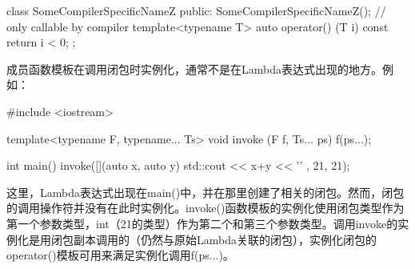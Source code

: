\begin{cpp}
class SomeCompilerSpecificNameZ
{
	public:
	SomeCompilerSpecificNameZ(); // only callable by compiler
	template<typename T>
	auto operator() (T i) const
	{
		return i < 0;
	}
};
\end{cpp}

成员函数模板在调用闭包时实例化，通常不是在Lambda表达式出现的地方。例如：

\begin{cpp}
#include <iostream>

template<typename F, typename... Ts> void invoke (F f, Ts... ps)
{
	f(ps...);
}

int main()
{
	invoke([](auto x, auto y) {
		std::cout << x+y << '\n'
	},
	21, 21);
}
\end{cpp}

这里，Lambda表达式出现在main()中，并在那里创建了相关的闭包。然而，闭包的调用操作符并没有在此时实例化。invoke()函数模板的实例化使用闭包类型作为第一个参数类型，int（21的类型）作为第二个和第三个参数类型。调用invoke的实例化是用闭包副本调用的（仍然与原始Lambda关联的闭包），实例化闭包的operator()模板可用来满足实例化调用f(ps...)。












